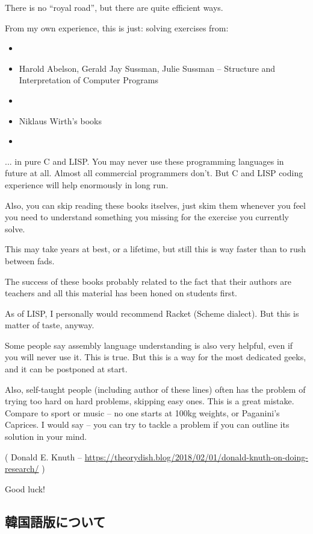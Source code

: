There is no ``royal road'', but there are quite efficient ways.

From my own experience, this is just: solving exercises from:

\begin{itemize}
\item \KRBook
\item Harold Abelson, Gerald Jay Sussman, Julie Sussman -- Structure and Interpretation of Computer Programs
\item \TAOCP
\item Niklaus Wirth's books
\item \RobPikePractice
\end{itemize}

... in pure C and LISP.
You may never use these programming languages in future at all.
Almost all commercial programmers don’t. But C and LISP coding experience will help enormously in long run.

Also, you can skip reading these books itselves,
just skim them whenever you feel you need to understand something you missing for the exercise you currently solve.

This may take years at best, or a lifetime, but still this is way faster than to rush between fads.

The success of these books probably related to the fact that their authors are teachers
and all this material has been honed on students first.

As of LISP, I personally would recommend Racket (Scheme dialect). But this is matter of taste, anyway.

Some people say assembly language understanding is also very helpful, even if you will never use it.
This is true.
But this is a way for the most dedicated geeks, and it can be postponed at start.

Also, self-taught people (including author of these lines) often has the problem of trying too hard on hard problems,
skipping easy ones.
This is a great mistake.
Compare to sport or music -- no one starts at 100kg weights, or Paganini's Caprices.
I would say -- you can try to tackle a problem if you can outline its solution in your mind.


( Donald E. Knuth -- \url{https://theorydish.blog/2018/02/01/donald-knuth-on-doing-research/} )

Good luck!


\subsection*{韓国語版について}

